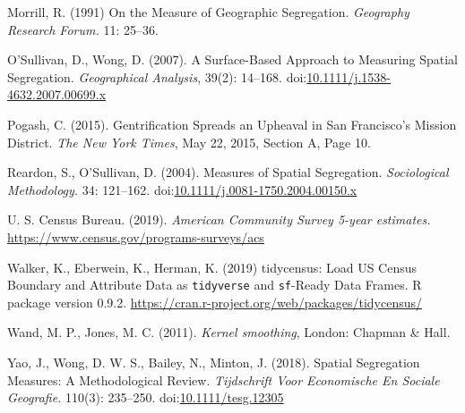\documentclass{article}
\theoremstyle{theorem}
\theoremstyle{definition}
\begin{document}
\begin{thebibliography}{3}
 Morrill, R. (1991) On the Measure of Geographic Segregation. \textit{Geography Research Forum.} 11: 25--36.

 O'Sullivan, D., Wong, D. (2007). A Surface-Based Approach to Measuring Spatial Segregation. \textit{Geographical Analysis}, 39(2): 14--168. doi:\href{http://dx.doi.org/10.1111/j.1538-4632.2007.00699.x}{10.1111/j.1538-4632.2007.00699.x}

Pogash, C. (2015). Gentrification Spreads an Upheaval in San Francisco's Mission District. \textit{The New York Times}, May 22, 2015, Section A, Page 10.

Reardon, S., O'Sullivan, D. (2004). Measures of Spatial Segregation. \textit{Sociological Methodology.} 34: 121--162. doi:\href{http://dx.doi.org/10.1111/j.0081-1750.2004.00150.x}{10.1111/j.0081-1750.2004.00150.x}

 U. S. Census Bureau. (2019). \textit{American Community Survey 5-year estimates.} \href{https://www.census.gov/programs-surveys/acs}{\url{https://www.census.gov/programs-surveys/acs}}

 Walker, K., Eberwein, K., Herman, K. (2019) tidycensus: Load US Census Boundary and Attribute Data as \texttt{tidyverse} and \texttt{sf}-Ready Data Frames. R package version 0.9.2. \href{https://cran.r-project.org/web/packages/tidycensus}{\url{https://cran.r-project.org/web/packages/tidycensus/}}

 Wand, M. P., Jones, M. C. (2011). \textit{Kernel smoothing}, London: Chapman \& Hall.

 Yao, J., Wong, D. W. S., Bailey, N., Minton, J. (2018). Spatial Segregation Measures: A Methodological Review. \textit{Tijdschrift Voor Economische En Sociale Geografie.} 110(3): 235--250. doi:\href{https://doi.org/10.1111/tesg.12305}{10.1111/tesg.12305}

\end{thebibliography}
\end{document}

